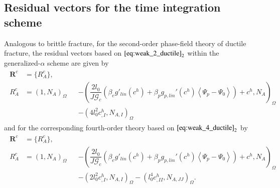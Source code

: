 \subsection{Residual vectors for the time integration scheme}
Analogous to brittle fracture, for the second-order phase-field theory of ductile fracture, the residual vectors based on $\eqref{eq:weak_2_ductile}_{2}$ within the generalized-$\alpha$ scheme are given by
\begin{equation} \label{eq:res_vecs_c2_ductile}
	\begin{aligned}
	\begin{alignedat}{2}
		\mathbf{R}^{c}&=\{R_{A}^{c}\}, \\
		R_{A}^{c} &= \left(1,N_{A}\right)_{\Omega} &&- \left(\dfrac{2l_{0}}{J\mathcal{G}_{c}}\left(\beta_{e}g'_{lin}\left(c^{h}\right)+\beta_{p}g_{p,lin}'\left(c^{h}\right)\left<\Psi_{p}-\Psi_{0}\right>\right)+c^{h},N_{A}\right)_{\Omega} \\
			& &&- \left(4l_{0}^{2}c^{h}_{,I},N_{A,I}\right)_{\Omega}
			\end{alignedat}
	\end{aligned}
\end{equation}
and for the corresponding fourth-order theory based on $\eqref{eq:weak_4_ductile}_{2}$ by
\begin{equation} \label{eq:res_vecs_c4_ductile}
	\begin{aligned}
	\begin{alignedat}{2}
		\mathbf{R}^{c}&=\{R_{A}^{c}\}, \\
		R_{A}^{c} &= \left(1,N_{A}\right)_{\Omega} &&- \left(\dfrac{2l_{0}}{J\mathcal{G}_{c}}\left(\beta_{e}g'_{lin}\left(c^{h}\right)+\beta_{p}g_{p,lin}'\left(c^{h}\right)\left<\Psi_{p}-\Psi_{0}\right>\right)+c^{h},N_{A}\right)_{\Omega} \\
		 & &&- \left(2l_{0}^{2}c^{h}_{,I},N_{A,I}\right)_{\Omega} - \left(l_{0}^{4}c^{h}_{,II},N_{A,JJ}\right)_{\Omega}.
	\end{alignedat}
	\end{aligned}
\end{equation}